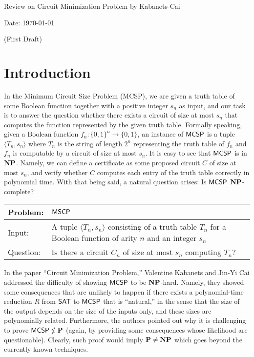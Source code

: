 \documentclass[12pt]{article}
\theoremstyle{definition}
\begin{document}
\smallskip
\smallskip
\smallskip

\begin{center}

{\Large Review on Circuit Minimization Problem by Kabanets-Cai}

\bigskip
{\normalsize Date: \today}

\bigskip
{\normalsize (First Draft)}

\end{center}

\section{Introduction}

In the Minimum Circuit Size Problem (MCSP), we are given a truth table of some Boolean function together with a positive integer $s_n$ as input, and our task is to answer the question whether there exists a circuit of size at most $s_n$ that computes the function represented by the given truth table. Formally speaking, given a Boolean function $f_n: \{0, 1\}^n \rightarrow \{0, 1\}$, an instance of $\mathsf{MCSP}$ is a tuple $\langle T_n, s_n \rangle$ where $T_n$ is the string of length $2^n$
representing the truth table of $f_n$ and $f_n$ is computable by a circuit of size at most $s_n$. It is easy to see that $\mathsf{MCSP}$ is in $\mathbf{NP}$. Namely, we can define a certificate as some proposed circuit $C$ of size at most $s_n$, and verify whether $C$ computes each entry of the truth table correctly in polynomial time. With that being said, a natural question arises: Is $\mathsf{MCSP}$  $\mathbf{NP}$-complete?

{
\color{gray}
\renewcommand{\arraystretch}{1.5}
\begin{center}
  \begin{tabular}{|p{2cm}p{11cm}|}
    \hline
    Problem:
    &
    $\mathsf{MSCP}$
    \\
    \hline
    Input:
    &
    A tuple $\langle T_n, s_n \rangle$ consisting of a truth table $T_n$ for
    a Boolean function of arity $n$ and an integer $s_n$
    \\
    Question: & Is there a circuit $C_n$ of size at most $s_n$ computing $T_n$?
    \\
    \hline
  \end{tabular}
\end{center}
}

In the paper ``Circuit Minimization Problem,'' Valentine Kabanets and Jin-Yi Cai addressed the difficulty of showing $\mathsf{MCSP}$ to be $\mathbf{NP}$-hard. Namely, they showed some consequences that are unlikely to happen if there exists a polynomial-time reduction $R$ from $\mathsf{SAT}$ to $\mathsf{MCSP}$ that is ``natural,'' in the sense that the size of the output depends on the size of the inputs only, and these sizes are polynomially related.  Furthermore, the authors pointed out why it is challenging to prove $\mathsf{MCSP} \notin \mathbf{P}$ (again, by providing some consequences whose likelihood are questionable). Clearly, such proof would imply $\mathbf{P} \neq \mathbf{NP}$ which goes beyond the currently known techniques. 
\end{document}
